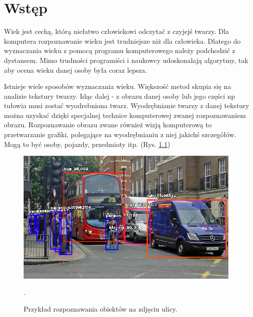 \documentclass[a4paper,twoside,12pt]{book}
\newcounter{stronyPozaNumeracja}
\begin{document}
 

\cleardoublepage


\pagestyle{tylkoNumeryStron}
\tableofcontents

\setcounter{stronyPozaNumeracja}{\value{page}}
\mainmatter
\pagestyle{NumeryStronNazwyRozdzialow}


\chapter{Wstęp}

Wiek jest cechą, którą niełatwo człowiekowi odczytać z czyjejś twarzy. Dla komputera rozpoznawanie wieku jest trudniejsze niż dla człowieka. Dlatego do wyznaczania wieku z pomocą programu komputerowego należy podchodzić z dystansem. Mimo trudności programiści i naukowcy udoskonalają algorytmy, tak aby ocena wieku danej osoby była coraz lepsza.

Istnieje wiele sposobów wyznaczania wieku. Większość metod skupia się na analizie tekstury twarzy. Idąc dalej - z obrazu danej osoby lub jego części np tułowia musi zostać wyodrebniona twarz. Wyodrębnianie twarzy z danej tekstury można uzyskać dzięki specjalnej technice komputerowej zwanej rozpoznawaniem obrazu. Rozpoznawanie obrazu zwane również wizją komputerową to przetwarzanie grafiki, polegające na wyodrębnianiu z niej jakichś szczegółów. Mogą to być osoby, pojazdy, przedmioty itp. (Rys. \ref{fig.rozpoznawanieObiektow})

\begin{figure}
	\centering
	\includegraphics[width=11cm]{Obrazy/rozpoznawanieObiektow} 
	\caption{Przykład rozpoznawania obiektów na zdjęciu ulicy. \cite{rozpoznawanieObiektow}}.
	\label{fig.rozpoznawanieObiektow}
\end{figure}
\end{document}
